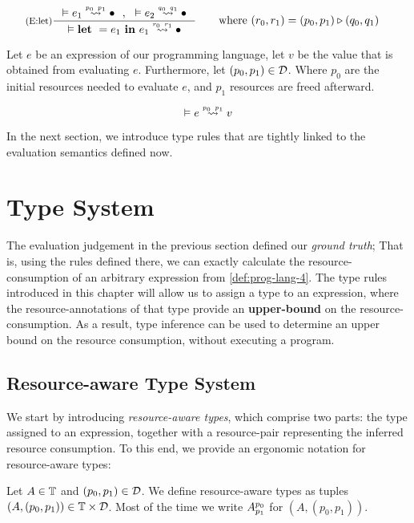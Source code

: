 \[
   \inference[(E:let)]
   {\evals{}{e_1}{\bullet}{p_0}{p_1} ~~,~~ \evals{}{e_2}{\bullet}{q_0}{q_1}}
   {\evals{}{\letexp{}{e_1}{e_1}}{\bullet}{r_0}{r_1}}
   \qquad
   \begin{aligned}
      \text{where }  &(r_0, r_1) = (p_0, p_1) \sequence (q_0, q_1) 
   \end{aligned}
\]


\begin{definition}\label{def:evaluation-judgement}
   Let \(e\) be an expression of our programming language, let \(v\) be the value that is obtained from evaluating \(e\). Furthermore, let \((p_0, p_1) \in \mathcal{D}\). 
   Where \(p_0\) are the initial resources needed to evaluate \(e\), and \(p_1\) resources are freed afterward.
   
   \[
      \evals{}{e}{v}{p_0}{p_1}
   \]
\end{definition}

In the next section, we introduce type rules that are tightly linked to the evaluation semantics defined now. 

\section{Type System}
The evaluation judgement in the previous section defined our \emph{ground truth}; That is, using the rules defined there, we can exactly calculate the resource-consumption of an arbitrary expression from \cref{def:prog-lang-4}. The type rules introduced in this chapter will allow us to assign a type to an expression, where the resource-annotations of that type provide an \textbf{upper-bound} on the resource-consumption. As a result, type inference can be used to determine an upper bound on the resource consumption, without executing a program.

\subsection{Resource-aware Type System}

We start by introducing \emph{resource-aware types}, which comprise two parts: the type assigned to an expression, together with a resource-pair representing the inferred resource consumption. To this end, we provide an ergonomic notation for resource-aware types:

\begin{definition}\label{def:ra-type}
   Let \(A \in \mathbb{T}\) and \((p_0, p_1) \in \mathcal{D}\). We define resource-aware types as tuples \((A, (p_0, p_1)) \in \mathbb{T} \times \mathcal{D}\). Most of the time we write \(A ^{p_0}_{p_1}\) for \((A, (p_0, p_1))\). 
\end{definition}

